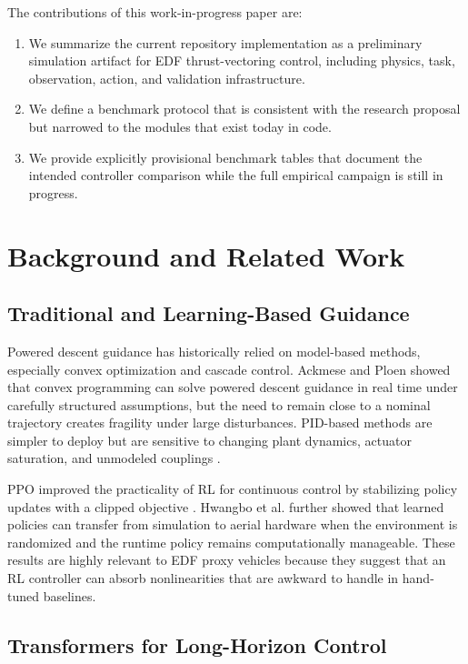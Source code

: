 \documentclass[10pt,twocolumn]{article}
\begin{document}
The contributions of this work-in-progress paper are:
\begin{enumerate}
    \item We summarize the current repository implementation as a preliminary simulation artifact for EDF thrust-vectoring control, including physics, task, observation, action, and validation infrastructure.
    \item We define a benchmark protocol that is consistent with the research proposal but narrowed to the modules that exist today in code.
    \item We provide explicitly provisional benchmark tables that document the intended controller comparison while the full empirical campaign is still in progress.
\end{enumerate}

\section{Background and Related Work}

\subsection{Traditional and Learning-Based Guidance}

Powered descent guidance has historically relied on model-based methods, especially convex optimization and cascade control. Ackmese and Ploen \cite{ackmese2007} showed that convex programming can solve powered descent guidance in real time under carefully structured assumptions, but the need to remain close to a nominal trajectory creates fragility under large disturbances. PID-based methods are simpler to deploy but are sensitive to changing plant dynamics, actuator saturation, and unmodeled couplings \cite{konstantopoulos2020}.

PPO improved the practicality of RL for continuous control by stabilizing policy updates with a clipped objective \cite{schulman2017}. Hwangbo et al. \cite{hwangbo2017} further showed that learned policies can transfer from simulation to aerial hardware when the environment is randomized and the runtime policy remains computationally manageable. These results are highly relevant to EDF proxy vehicles because they suggest that an RL controller can absorb nonlinearities that are awkward to handle in hand-tuned baselines.

\subsection{Transformers for Long-Horizon Control}
\end{document}
